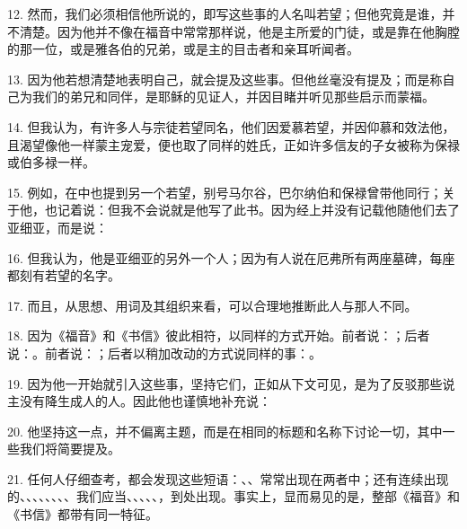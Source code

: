 12. 然而，我们必须相信他所说的，即写这些事的人名叫若望；但他究竟是谁，并不清楚。因为他并不像在福音中常常那样说，他是主所爱的门徒，或是靠在他胸膛的那一位，或是雅各伯的兄弟，或是主的目击者和亲耳听闻者。\par

13. 因为他若想清楚地表明自己，就会提及这些事。但他丝毫没有提及；而是称自己为我们的弟兄和同伴，是耶稣的见证人，并因目睹并听见那些启示而蒙福。\par

14. 但我认为，有许多人与宗徒若望同名，他们因爱慕若望，并因仰慕和效法他，且渴望像他一样蒙主宠爱，便也取了同样的姓氏，正如许多信友的子女被称为保禄或伯多禄一样。\par

15. 例如，在中也提到另一个若望，别号马尔谷，巴尔纳伯和保禄曾带他同行；关于他，也记着说：但我不会说就是他写了此书。因为经上并没有记载他随他们去了亚细亚，而是说：\par

16. 但我认为，他是亚细亚的另外一个人；因为有人说在厄弗所有两座墓碑，每座都刻有若望的名字。\par

17. 而且，从思想、用词及其组织来看，可以合理地推断此人与那人不同。\par

18. 因为《福音》和《书信》彼此相符，以同样的方式开始。前者说：；后者说：。前者说：；后者以稍加改动的方式说同样的事：。\par

19. 因为他一开始就引入这些事，坚持它们，正如从下文可见，是为了反驳那些说主没有降生成人的人。因此他也谨慎地补充说：\par

20. 他坚持这一点，并不偏离主题，而是在相同的标题和名称下讨论一切，其中一些我们将简要提及。\par

21. 任何人仔细查考，都会发现这些短语：、、常常出现在两者中；还有连续出现的、、、、、、、、我们应当、、、、、，到处出现。事实上，显而易见的是，整部《福音》和《书信》都带有同一特征。\par

